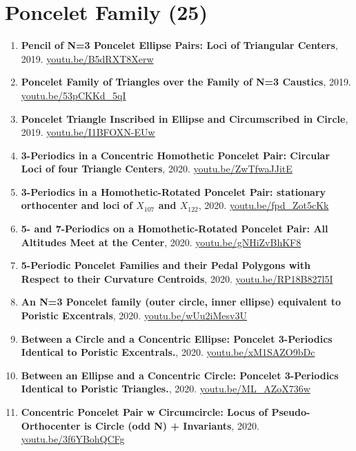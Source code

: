 \documentclass[12pt]{article}
\begin{document}
\section{Poncelet Family (25)}

\begin{enumerate}[resume]
\item \textbf{Pencil of N=3 Poncelet Ellipse Pairs: Loci of Triangular Centers}, 2019. \href{https://youtu.be/B5dRXT8Xerw}{\url{youtu.be/B5dRXT8Xerw}}
\item \textbf{Poncelet Family of Triangles over the Family of N=3 Caustics}, 2019. \href{https://youtu.be/53pCKKd_5qI}{\url{youtu.be/53pCKKd\_5qI}}
\item \textbf{Poncelet Triangle Inscribed in Ellipse and Circumscribed in Circle}, 2019. \href{https://youtu.be/I1BFOXN-EUw}{\url{youtu.be/I1BFOXN-EUw}}
\item \textbf{3-Periodics in a Concentric Homothetic Poncelet Pair: Circular Loci of four Triangle Centers}, 2020. \href{https://youtu.be/ZwTfwaJJitE}{\url{youtu.be/ZwTfwaJJitE}}
\item \textbf{3-Periodics in a Homothetic-Rotated Poncelet Pair: stationary orthocenter and loci of $X_{107}$ and $X_{122}$}, 2020. \href{https://youtu.be/fpd_Zot5cKk}{\url{youtu.be/fpd\_Zot5cKk}}
\item \textbf{5- and 7-Periodics on a Homothetic-Rotated Poncelet Pair: All Altitudes Meet at the Center}, 2020. \href{https://youtu.be/gNHiZvBhKF8}{\url{youtu.be/gNHiZvBhKF8}}
\item \textbf{5-Periodic Poncelet Families and their Pedal Polygons with Respect to their Curvature Centroids}, 2020. \href{https://youtu.be/RP18B827l5I}{\url{youtu.be/RP18B827l5I}}
\item \textbf{An N=3 Poncelet family (outer circle, inner ellipse) equivalent to Poristic Excentrals}, 2020. \href{https://youtu.be/wUu2iMesv3U}{\url{youtu.be/wUu2iMesv3U}}
\item \textbf{Between a Circle and a Concentric Ellipse: Poncelet 3-Periodics Identical to Poristic Excentrals.}, 2020. \href{https://youtu.be/xM1SAZO9bDc}{\url{youtu.be/xM1SAZO9bDc}}
\item \textbf{Between an Ellipse and a Concentric Circle: Poncelet 3-Periodics Identical to Poristic Triangles.}, 2020. \href{https://youtu.be/ML_AZoX736w}{\url{youtu.be/ML\_AZoX736w}}
\item \textbf{Concentric Poncelet Pair w Circumcircle: Locus of Pseudo-Orthocenter is Circle (odd N) + Invariants}, 2020. \href{https://youtu.be/3f6YBohQCFg}{\url{youtu.be/3f6YBohQCFg}}

\end{enumerate}
\end{document}
